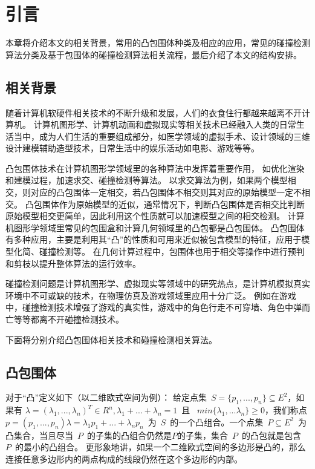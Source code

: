 

\chapter{引言}
\label{cha:intro}

本章将介绍本文的相关背景，常用的凸包围体种类及相应的应用，常见的碰撞检测算法分类及基于包围体的碰撞检测算法相关流程，最后介绍了本文的结构安排。


\section{相关背景}

随着计算机软硬件相关技术的不断升级和发展，人们的衣食住行都越来越离不开计算机。
计算机图形学、计算机动画和虚拟现实等相关技术已经融入人类的日常生活当中，成为人们生活的重要组成部分，如医学领域的虚拟手术、设计领域的三维设计建模辅助造型技术，日常生活中的娱乐活动如电影、游戏等等。

凸包围体技术在计算机图形学领域里的各种算法中发挥着重要作用，
如优化渲染和建模过程，加速求交、碰撞检测等算法。
以求交算法为例，如果两个模型相交，则对应的凸包围体一定相交，若凸包围体不相交则其对应的原始模型一定不相交。
凸包围体作为原始模型的近似，通常情况下，判断凸包围体是否相交比判断原始模型相交更简单，因此利用这个性质就可以加速模型之间的相交检测。
计算机图形学领域里常见的包围盒和计算几何领域里的凸包都是凸包围体。
凸包围体有多种应用，主要是利用其“凸”的性质和可用来近似被包含模型的特征，应用于模型化简、碰撞检测等。
在几何计算过程中，包围体也用于相交等操作中进行预判和剪枝以提升整体算法的运行效率。

碰撞检测问题是计算机图形学、虚拟现实等领域中的研究热点，是计算机模拟真实环境中不可或缺的技术，在物理仿真及游戏领域里应用十分广泛。
例如在游戏中，碰撞检测技术增强了游戏的真实性，游戏中的角色行走不可穿墙、角色中弹而亡等等都离不开碰撞检测技术。

下面将分别介绍凸包围体相关技术和碰撞检测相关算法。

\section{凸包围体}
\label{sec:convex-bv}

对于“凸”定义\cite{dengcg}如下（以二维欧式空间为例）：
给定点集~$S = \{p_1, ..., p_n\} \subseteq E^2$，如果有
$\lambda = (\lambda_1,...,\lambda_n)^T \in R^n, \lambda_1 + ... + \lambda_n = 1
$~且~ $min\{\lambda_1,...\lambda_n\} \geq 0$，我们称点 $p = (p_1, ... ,
p_n)\lambda = \lambda_1 p_1 + ... + \lambda_n
p_n$~为~$S$~的一个凸组合。一个点集~$P \subseteq E^2$~为凸集合，当且尽当~$P$~的子集的凸组合仍然是$P$的子集，集合~$P$~的凸包就是包含~$P$~的最小的凸组合。
更形象地讲，如果一个二维欧式空间的多边形是凸的，那么连接任意多边形内的两点构成的线段仍然在这个多边形的内部。

